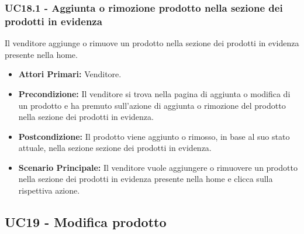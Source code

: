 \subsubsection{UC18.1 - Aggiunta o rimozione prodotto nella sezione dei prodotti in evidenza}
\label{UC19.1}
Il venditore aggiunge o rimuove un prodotto nella sezione dei prodotti in evidenza presente nella home.
\begin{itemize}
    \item \textbf{Attori Primari:} Venditore.
    \item \textbf{Precondizione:} Il venditore si trova nella pagina di aggiunta o modifica di un prodotto e ha premuto sull'azione di aggiunta o rimozione del prodotto nella sezione dei prodotti in evidenza.
    \item \textbf{Postcondizione:} Il prodotto viene aggiunto o rimosso, in base al suo stato attuale, nella sezione sezione dei prodotti in evidenza. 
    \item \textbf{Scenario Principale:} Il venditore vuole aggiungere o rimuovere un prodotto nella sezione dei prodotti in evidenza presente nella home e clicca sulla rispettiva azione.
\end{itemize}

\subsection{UC19 - Modifica prodotto}
\label{UC19}

